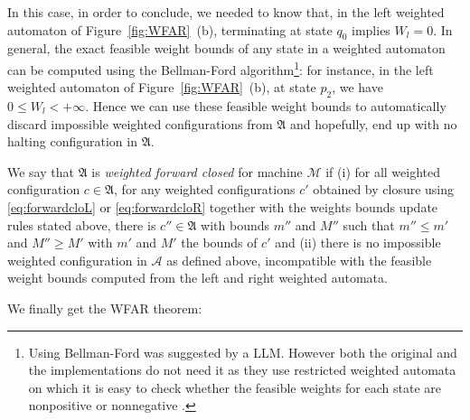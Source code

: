 In this case, in order to conclude, we needed to know that, in the left weighted automaton of Figure~\ref{fig:WFAR}~(b), terminating at state $q_0$ implies $W_l = 0$. In general, the exact feasible weight bounds of any state in a weighted automaton can be computed using the Bellman-Ford algorithm\footnote{Using Bellman-Ford was suggested by a LLM. However both the original and the \CoqBB implementations do not need it as they use restricted weighted automata on which it is easy to check whether the feasible weights for each state are nonpositive or nonnegative \cite{iijil1_2025_14914502}.}: for instance, in the left weighted automaton of Figure~\ref{fig:WFAR}~(b), at state $p_2$, we have $0 \leq W_l < +\infty$. Hence we can use these feasible weight bounds to automatically discard impossible weighted configurations from $\mathfrak{A}$ and hopefully, end up with no halting configuration in $\mathfrak{A}$.

We say that $\mathfrak{A}$ is \textit{weighted forward closed} for machine $\mathcal{M}$ if (i) for all weighted configuration $c \in \mathfrak{A}$, for any weighted configurations $c'$ obtained by closure using \eqref{eq:forwardcloL} or \eqref{eq:forwardcloR} together with the weights bounds update rules stated above, there is $c'' \in \mathfrak{A}$ with bounds $m''$ and $M''$ such that $m'' \leq m'$ and $M'' \geq M'$ with $m'$ and $M'$ the bounds of $c'$ and (ii) there is no impossible weighted configuration in $\mathcal{A}$ as defined above, \ie incompatible with the feasible weight bounds computed from the left and right weighted automata.

We finally get the WFAR theorem:

